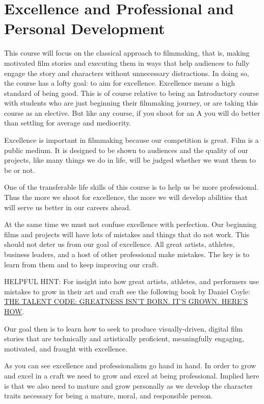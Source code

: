 \documentclass[
]{book}
\begin{document}
\hypertarget{excellence-and-professional-and-personal-development}{%
\section{Excellence and Professional and Personal Development}\label{excellence-and-professional-and-personal-development}}

This course will focus on the classical approach to filmmaking, that is, making motivated film stories and executing them in ways that help audiences to fully engage the story and characters without unnecessary distractions. In doing so, the course has a lofty goal: to aim for excellence. Excellence means a high standard of being good. This is of course relative to being an Introductory course with students who are just beginning their filmmaking journey, or are taking this course as an elective. But like any course, if you shoot for an A you will do better than settling for average and mediocrity.

Excellence is important in filmmaking because our competition is great. Film is a public medium. It is designed to be shown to audiences and the quality of our projects, like many things we do in life, will be judged whether we want them to be or not.

One of the transferable life skills of this course is to help us be more professional. Thus the more we shoot for excellence, the more we will develop abilities that will serve us better in our careers ahead.

At the same time we must not confuse excellence with perfection. Our beginning films and projects will have lots of mistakes and things that do not work. This should not deter us from our goal of excellence. All great artists, athletes, business leaders, and a host of other professional make mistakes. The key is to learn from them and to keep improving our craft.

HELPFUL HINT: For insight into how great artists, athletes, and performers use mistakes to grow in their art and craft see the following book by Daniel Coyle: \href{http://danielcoyle.com/the-talent-code/}{THE TALENT CODE: GREATNESS ISN'T BORN. IT'S GROWN. HERE'S HOW}.

Our goal then is to learn how to seek to produce visually-driven, digital film stories that are technically and artistically proficient, meaningfully engaging, motivated, and fraught with excellence.

As you can see excellence and professionalism go hand in hand. In order to grow and excel in a craft we need to grow and excel at being professional. Implied here is that we also need to mature and grow personally as we develop the character traits necessary for being a mature, moral, and responsible person.
\end{document}
